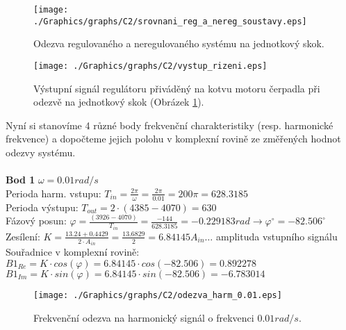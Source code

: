 \documentclass{article}
\begin{document}
			\begin{figure}[H]
				\centering
				\texttt{[image: ./Graphics/graphs/C2/srovnani\_reg\_a\_nereg\_soustavy.eps]}
				\caption{Odezva regulovaného a neregulovaného systému na jednotkový skok.}
				\label{pic:porovnani_regul_neregul_system}
			\end{figure}
			\begin{figure}[H]
				\centering
				\texttt{[image: ./Graphics/graphs/C2/vystup\_rizeni.eps]}
				\caption{Výstupní signál regulátoru přiváděný na kotvu motoru čerpadla při odezvě na jednotkový skok (Obrázek \ref{pic:porovnani_regul_neregul_system}).}
				\label{pic:vystup_rizeni_regul_systemu}
			\end{figure}
			Nyní si stanovíme 4 různé body frekvenční charakteristiky (resp. harmonické frekvence) a dopočteme jejich polohu v komplexní rovině ze změřených hodnot odezvy systému.\\\\
			\textbf{Bod 1 }$\omega=0.01 rad/s$\\
			Perioda harm. vstupu: \(T_{in}=\frac{2\pi}{\omega}=\frac{2\pi}{0.01}=200\pi=628.3185\)\\
			Perioda výstupu: \(T_{out}=2\cdot(4385-4070)=630\)\\
			Fázový posun: \(\varphi=\frac{(3926-4070)}{T_{in}}=\frac{-144}{628.3185}=-0.229183 rad\rightarrow \varphi^{\circ}=-82.506^{\circ}\)\\
			Zesílení: \(K=\frac{13.24+0.4429}{2\cdot A_{in}}=\frac{13.6829}{2}=6.84145\)\hspace{1cm}\(A_{in}\dots\) amplituda vstupního signálu\\
			Souřadnice v komplexní rovině:\\
			\(B1_{Re}=K\cdot cos(\varphi)=6.84145\cdot cos(-82.506)=0.892278\)\\
			\(B1_{Im}=K\cdot sin(\varphi)=6.84145\cdot sin(-82.506)=-6.783014\)
			\begin{figure}[H]
				\centering
				\texttt{[image: ./Graphics/graphs/C2/odezva\_harm\_0.01.eps]}
				\caption{Frekvenční odezva na harmonický signál o frekvenci \(0.01 rad/s\).}
				\label{pic:bod1}
			\end{figure}
			
\end{document}
